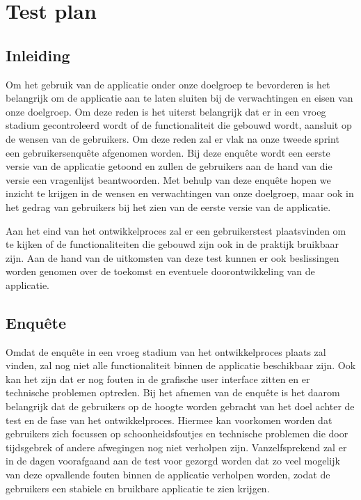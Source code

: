 \section{Test plan}
\subsection{Inleiding}
Om het gebruik van de applicatie onder onze doelgroep te bevorderen is het belangrijk om de applicatie aan te laten sluiten bij de verwachtingen en eisen van onze doelgroep. Om deze reden is het uiterst belangrijk dat er in een vroeg stadium gecontroleerd wordt of de functionaliteit die gebouwd wordt, aansluit op de wensen van de gebruikers. Om deze reden zal er vlak na onze tweede sprint een gebruikersenquête afgenomen worden. Bij deze enquête wordt een eerste versie van de applicatie getoond en zullen de gebruikers aan de hand van die versie een vragenlijst beantwoorden. Met behulp van deze enquête hopen we inzicht te krijgen in de wensen en verwachtingen van onze doelgroep, maar ook in het gedrag van gebruikers bij het zien van de eerste versie van de applicatie.

Aan het eind van het ontwikkelproces zal er een gebruikerstest plaatsvinden om te kijken of de functionaliteiten die gebouwd zijn ook in de praktijk bruikbaar zijn. Aan de hand van de uitkomsten van deze test kunnen er ook beslissingen worden genomen over de toekomst en eventuele doorontwikkeling van de applicatie.

\subsection{Enquête}
Omdat de enquête in een vroeg stadium van het ontwikkelproces plaats zal vinden, zal nog niet alle functionaliteit binnen de applicatie beschikbaar zijn. Ook kan het zijn dat er nog fouten in de grafische user interface zitten en er technische problemen optreden. Bij het afnemen van de enquête is het daarom belangrijk dat de gebruikers op de hoogte worden gebracht van het doel achter de test en de fase van het ontwikkelproces. Hiermee kan voorkomen worden dat gebruikers zich focussen op schoonheidsfoutjes en technische problemen die door tijdsgebrek of andere afwegingen nog niet verholpen zijn. Vanzelfsprekend zal er in de dagen voorafgaand aan de test voor gezorgd worden dat zo veel mogelijk van deze opvallende fouten binnen de applicatie verholpen worden, zodat de gebruikers een stabiele en bruikbare applicatie te zien krijgen.

